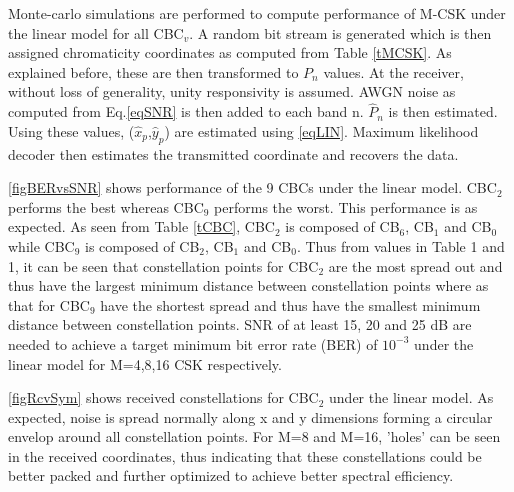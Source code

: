 \documentclass[10pt,letterpaper]{article}
\begin{document}
Monte-carlo simulations are performed to compute performance of M-CSK under the linear model for all CBC$_{v}$. A random bit stream is generated which is then assigned chromaticity coordinates as computed from Table \ref{tMCSK}. As explained before, these are then transformed to $P_{n}$ values. At the receiver, without loss of generality, unity responsivity is assumed. AWGN noise as computed from Eq.\eqref{eqSNR} is then added to each band n. $\hat{P}_{n}$ is then estimated. Using these values, ($\hat{x}_p$,$\hat{y}_p$) are estimated using \eqref{eqLIN}. Maximum likelihood decoder then estimates the transmitted coordinate and recovers the data.

\figurename\ref{figBERvsSNR} shows performance of the 9 CBCs under the linear model. CBC$_{2}$ performs the best whereas CBC$_{9}$ performs the worst. This performance is as expected. As seen from Table \ref{tCBC}, CBC$_{2}$ is composed of CB$_{6}$, CB$_{1}$ and CB$_{0}$ while CBC$_{9}$ is composed of CB$_{2}$, CB$_{1}$ and CB$_{0}$. Thus from values in Table 1 and \figurename 1, it can be seen that constellation points for CBC$_{2}$ are the most spread out and thus have the largest minimum distance between constellation points where as that for CBC$_{9}$ have the shortest spread and thus have the smallest minimum distance between constellation points. SNR of at least 15, 20 and 25 dB are needed to achieve a target minimum bit error rate (BER) of $10^{-3}$ under the linear model for M=4,8,16 CSK respectively.

\figurename\ref{figRcvSym} shows received constellations for CBC$_{2}$ under the linear model. As expected, noise is spread normally along x and y dimensions forming a circular envelop around all constellation points. For M=8 and M=16, 'holes' can be seen in the received coordinates, thus indicating that these constellations could be better packed and further optimized to achieve better spectral efficiency. 
\end{document}
